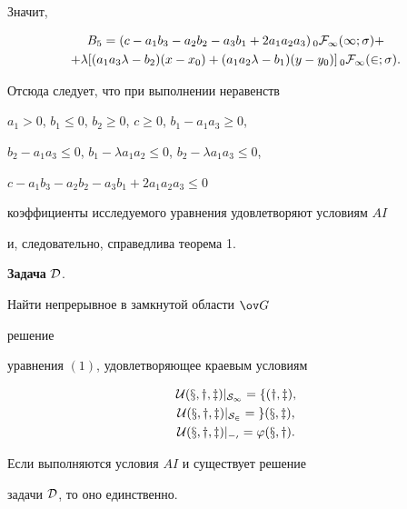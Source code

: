 Значит, 


\begin{gather*} 


B_5=(c-a_1b_3-a_2b_2-a_3b_1+2a_1a_2a_3)\,_0\cal F_1(1;\sigma)+\\ 


% 


+\lambda[(a_1a_3\lambda-b_2)(x-x_0)+ 


(a_1a_2\lambda-b_1)(y-y_0)]\,_0\cal F_1(2;\sigma). 


\end{gather*} 


Отсюда следует, что при выполнении неравенств 


$a_1>0$, $b_1\le0$, $b_2\ge0$, $c\ge0$, $b_1-a_1a_3\ge0$, 


$b_2-a_1a_3\le0$, $b_1-\lambda a_1a_2\le0$, $b_2-\lambda a_1a_3\le0$, 


$c-a_1b_3-a_2b_2-a_3b_1+2a_1a_2a_3\le0$ 


коэффициенты исследуемого уравнения удовлетворяют условиям $AI$ 


и, следовательно, справедлива теорема 1. 


\medskip 


 


{\bf Задача} $\cal D$. {\it 


Найти непрерывное в замкнутой области $\ov G$ 


решение 


уравнения $(1)$, удовлетворяющее краевым условиям} 


\begin{gather*} 


\cal U(x,y,z)|_{\cal S_1}=f(y,z),\\ 


\cal U(x,y,z)|_{\cal S_2}=g(x,z),\\ 


\cal U(x,y,z)|_{\Gamma_0}=\varphi(x,y). 


\end{gather*} 


 


\begin{thm} 


Если выполняются условия $AI$ и существует решение 


задачи $\cal D$, то оно единственно. 


\end{thm} 


